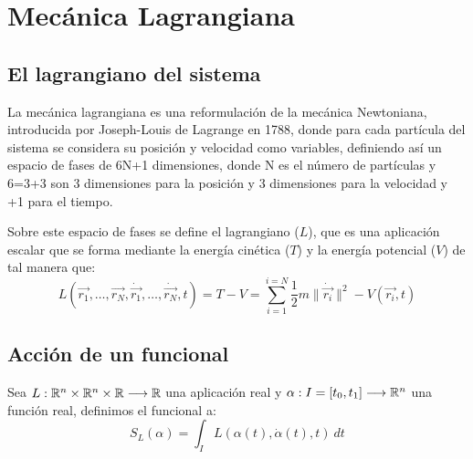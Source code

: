 \chapter{Mecánica Lagrangiana}
\section{El lagrangiano del sistema}

La mecánica lagrangiana es una reformulación de la mecánica Newtoniana, introducida por Joseph-Louis de Lagrange en 1788, donde para cada partícula del sistema se considera su posición y velocidad como variables, definiendo así un espacio de fases de 6N+1 dimensiones, donde N es el número de partículas y 6=3+3 son 3 dimensiones para la posición y 3 dimensiones para la velocidad y +1 para el tiempo.

Sobre este espacio de fases se define el lagrangiano ($L$), que es una aplicación escalar que se forma mediante la energía cinética ($T$) y la energía potencial ($V$) de tal manera que:
\begin{equation}
	\label{eq:lagrangiano_clasico}
	L(\vec{r_1},\dots,\vec{r_N},\dot{\vec{r_1}},\dots,\dot{\vec{r_N}},t)=T-V=\sum\limits_{i=1}^{i=N} \frac{1}{2}m\|\dot{\vec{r_i}}\|^2-V(\vec{r_i},t)
\end{equation}

\section{Acción de un funcional}
	Sea $L:\mathbb{R}^n\times\mathbb{R}^n\times\mathbb{R}\longrightarrow \mathbb{R}$ una aplicación real y $\alpha:I=[t_0, t_1]\longrightarrow \mathbb{R}^n$ una función real, definimos el funcional  a:
	\begin{equation}
		\label{eq:accion}
		S_L(\alpha) = \int_{I}L(\alpha(t), \dot{\alpha}(t), t)\ dt
	\end{equation}

